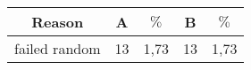 \documentclass{article}
\begin{document}
\begin{tabular}{|c||c|c||c|c|}
\hline
Reason&A& $\%$&B& $\%$\\
\hline
failed random&13&1,73&13&1,73\\
\hline
\end{tabular}
\end{document}
